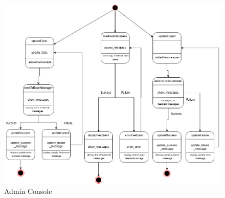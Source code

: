 \begin{figure}[H]
	\centering
	\includegraphics[width=\linewidth]{Section2/Admin Console.png}
	\caption{Admin Console}
	\label{AdminConsole}
\end{figure}
